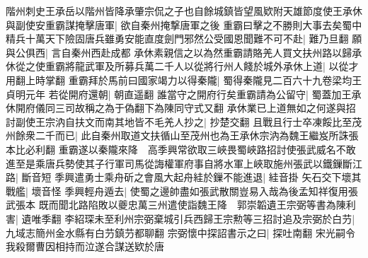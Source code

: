階州刺史王承岳以階州皆降承肇宗侃之子也自餘城鎮皆望風欵附天雄節度使王承休與副使安重霸謀掩擊唐軍|{
	欲自秦州掩撃唐軍之後}
重霸曰擊之不勝則大事去矣蜀中精兵十萬天下險固唐兵雖勇安能直度劍門邪然公受國恩聞難不可不赴|{
	難乃旦翻}
願與公俱西|{
	言自秦州西赴成都}
承休素親信之以為然重霸請賂羌人買文扶州路以歸承休從之使重霸將龍武軍及所募兵萬二千人以從將行州人餞於城外承休上道|{
	以從才用翻上時掌翻}
重霸拜於馬前曰國家竭力以得秦隴|{
	蜀得秦隴見二百六十九卷梁均王貞明元年}
若從開府還朝|{
	朝直遥翻}
誰當守之開府行矣重霸請為公留守|{
	蜀蓋加王承休開府儀同三司故稱之為于偽翻下為陳同守式又翻}
承休業已上道無如之何遂與招討副使王宗汭自扶文而南其地皆不毛羌人抄之|{
	抄楚交翻}
且戰且行士卒凍餒比至茂州餘衆二千而已|{
	此自秦州取道文扶循山至茂州也為王承休宗汭為魏王繼岌所誅張本比必利翻}
重霸遂以秦隴來降　高季興常欲取三峽畏蜀峽路招討使張武威名不敢進至是乘唐兵勢使其子行軍司馬從誨權軍府事自將水軍上峽取施州張武以鐵鏁斷江路|{
	斷音短}
季興遣勇士乘舟斫之會風大起舟絓於鏁不能進退|{
	絓音掛}
矢石交下壞其戰艦|{
	壞音怪}
季興輕舟遁去|{
	使蜀之邊帥盡如張武散關豈易入哉為後孟知祥復用張武張本}
既而聞北路陷敗以夔忠萬三州遣使詣魏王降　郭崇韜遺王宗弼等書為陳利害|{
	遺唯季翻}
李紹琛未至利州宗弼棄城引兵西歸王宗勲等三招討追及宗弼於白芀|{
	九域志簡州金水縣有白芀鎮芀都聊翻}
宗弼懷中探詔書示之曰|{
	探吐南翻}
宋光嗣令我殺爾曹因相持而泣遂合謀送欵於唐

